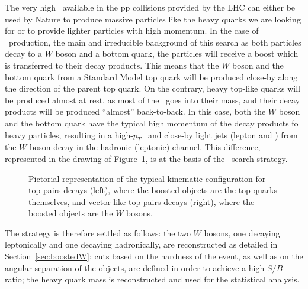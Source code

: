 The very high \cme\ available in the pp collisions provided by the LHC
can either be used by Nature to produce massive particles like the heavy 
quarks we are looking for or to provide lighter particles with high momentum.
In the case of \ttbar\ production, the main and irreducible background
of this search as both particles decay to a $W$ boson and a bottom quark,
the particles will receive a boost which is transferred to their decay
products. This means that the $W$ boson and the bottom quark from a Standard
Model top quark will be produced close-by along the direction of the parent
top quark. On the contrary, heavy top-like quarks will be produced almost
at rest, as most of the \cme\ goes into their mass, and their
decay products will be produced ``almost'' back-to-back. In this case,
both the $W$ boson and the bottom quark have the typical high
momentum of the decay products fo heavy particles, 
resulting in a high-$p_T$ \bjet\ and close-by light jets (lepton and \met)
from the $W$ boson decay in the hadronic (leptonic) channel. This
difference, represented in the drawing of Figure~\ref{fig:boostedkin},
is at the basis of the \wbx\ search strategy.

\begin{figure}[htb]\begin{center}
	\caption{Pictorial representation of the typical kinematic configuration
        for top pairs decays (left), where the boosted objects are the top
        quarks themselves, and vector-like top pairs decays (right), where the
        boosted objects are the $W$ bosons.\label{fig:boostedkin}}
\end{center}\end{figure}

The strategy is therefore settled as follows:
the two $W$ bosons, one decaying leptonically and
one decaying hadronically, are reconstructed
as detailed in Section~\ref{sec:boostedW};
cuts based on the hardness of the event, as well
as on the angular separation of the objects, are
defined in order to achieve a high $S/B$ ratio;
the heavy quark mass is reconstructed and used
for the statistical analysis.


